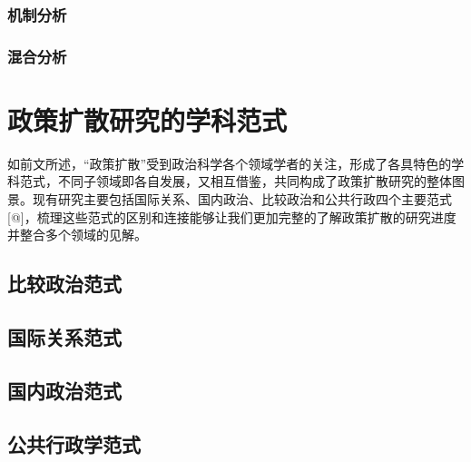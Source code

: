 \documentclass[
  12pt,
]{ctexart}
\begin{document}
\hypertarget{ux673aux5236ux5206ux6790}{%
\subsubsection{机制分析}\label{ux673aux5236ux5206ux6790}}

\hypertarget{ux6df7ux5408ux5206ux6790}{%
\subsubsection{混合分析}\label{ux6df7ux5408ux5206ux6790}}

\hypertarget{ux653fux7b56ux6269ux6563ux7814ux7a76ux7684ux5b66ux79d1ux8303ux5f0f}{%
\section{政策扩散研究的学科范式}\label{ux653fux7b56ux6269ux6563ux7814ux7a76ux7684ux5b66ux79d1ux8303ux5f0f}}

如前文所述，``政策扩散''受到政治科学各个领域学者的关注，形成了各具特色的学科范式，不同子领域即各自发展，又相互借鉴，共同构成了政策扩散研究的整体图景。现有研究主要包括国际关系、国内政治、比较政治和公共行政四个主要范式{[}@{]}，梳理这些范式的区别和连接能够让我们更加完整的了解政策扩散的研究进度并整合多个领域的见解。

\hypertarget{ux6bd4ux8f83ux653fux6cbbux8303ux5f0f}{%
\subsection{比较政治范式}\label{ux6bd4ux8f83ux653fux6cbbux8303ux5f0f}}

\hypertarget{ux56fdux9645ux5173ux7cfbux8303ux5f0f}{%
\subsection{国际关系范式}\label{ux56fdux9645ux5173ux7cfbux8303ux5f0f}}

\hypertarget{ux56fdux5185ux653fux6cbbux8303ux5f0f}{%
\subsection{国内政治范式}\label{ux56fdux5185ux653fux6cbbux8303ux5f0f}}

\hypertarget{ux516cux5171ux884cux653fux5b66ux8303ux5f0f}{%
\subsection{公共行政学范式}\label{ux516cux5171ux884cux653fux5b66ux8303ux5f0f}}
\end{document}
